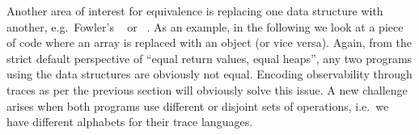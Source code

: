 Another area of interest for equivalence is replacing one data structure with another,
e.g.\ Fowler's ~\cite[p.186]{fowler:refactoring} or ~\cite{fowler:refactoring2nd}.
As an example, in the following we look at a piece of code where an array is replaced with an object (or vice versa).
Again, from the strict default perspective of ``equal return values, equal heaps'', any two programs using the data structures are obviously not equal.
Encoding observability through traces as per the previous section will obviously solve this issue.
A new challenge arises when both programs use different or disjoint sets of operations, i.e.\ we have different alphabets for their trace languages.




